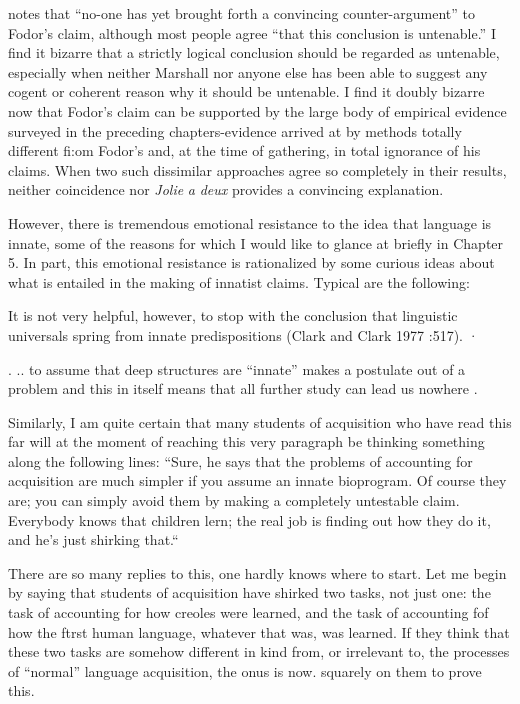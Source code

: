 \citet{Marshall1979} notes that ``no-one has yet brought forth a convincing counter-argument'' to Fodor's claim, although most people agree ``that this conclusion is untenable.'' I find it bizarre that a strictly logical conclusion should be regarded as untenable, especially when neither Marshall nor anyone else has been able to suggest any cogent or coherent reason why it should be untenable. I find it doubly bizarre now that Fodor's claim can be supported by the large body of empirical evidence surveyed in the preceding chapters-evidence arrived at by methods totally different fi:om Fodor's and, at the time of gathering, in total ignorance of his claims. When two such dissimilar approaches
agree so completely in their results, neither coincidence nor \textit{Jolie} \textit{a}
\textit{deux} provides a convincing explanation.

However, there is tremendous emotional resistance to the idea that language is innate, some of the reasons for which I would like to glance at briefly in Chapter 5. In part, this emotional resistance is rationalized by some curious ideas about what is entailed in the making of innatist claims. Typical are the following:

It is not very helpful, however, to stop with the conclu\-sion that linguistic universals spring from innate predisposi\-tions (Clark and Clark 1977 :517). ·

. .. to assume that deep structures are ``innate'' makes a postulate out of a problem and this in itself means that all further study can lead us nowhere \citep[383]{Luria1975}.

Similarly, I am quite certain that many students of acquisition who have read this far will at the moment of reaching this very para\-graph be thinking something along the following lines: ``Sure, he says that the problems of accounting for acquisition are much simpler if you assume an innate bioprogram. Of course they are; you can simply avoid them by making a completely untestable claim. Everybody knows that children lern; the real job is finding out how they do it, and he's
just shirking that.``


There are so many replies to this, one hardly knows where to start. Let me begin by saying that students of acquisition have shirked
two tasks, not just one: the task of accounting for how creoles were learned, and the task of accounting fof how the ftrst human language, whatever that was, was learned. If they think that these two tasks are somehow different in kind from, or irrelevant to, the processes of
``normal'' language acquisition, the onus is now. squarely on them to prove this.

